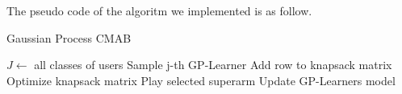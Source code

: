 The pseudo code of the algoritm we implemented is as follow.
\begin{algorithm}
	\caption{Gaussian Process CMAB}
	\begin{algorithmic}[1]
		\STATE $J\gets ${ all classes of users}
		\STATE Sample j-th GP-Learner
		\STATE Add row to knapsack matrix
		\ENDFOR
		\STATE Optimize knapsack matrix
		\STATE Play selected superarm
		\STATE Update GP-Learners model
	\end{algorithmic}
\end{algorithm}